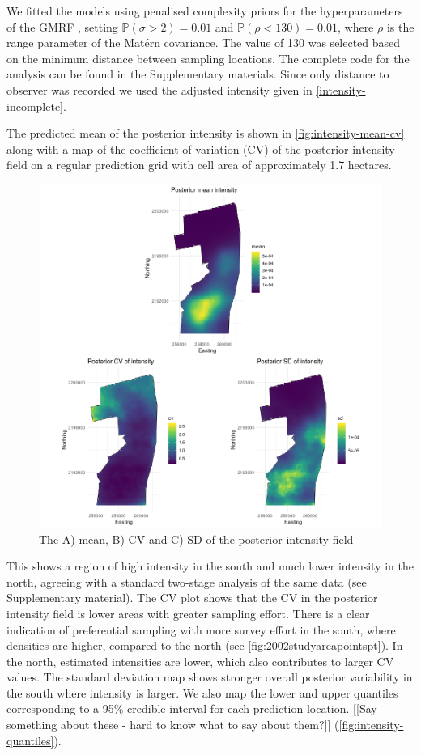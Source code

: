 \documentclass[preprint,12pt]{elsarticle}
\begin{document}
We fitted the models using penalised complexity priors for the hyperparameters of the GMRF \citep{simpson_penalising_2017}, setting $\mathbb{P}(\sigma > 2) = 0.01$ and $\mathbb{P}(\rho < 130) = 0.01$, where $\rho$ is the range parameter of the Mat\'ern covariance.  The value of 130 was selected based on the minimum distance between sampling locations.  The complete code for the analysis can be found in the Supplementary materials.  Since only distance to observer was recorded we used the adjusted intensity given in \eqref{intensity-incomplete}.   

The predicted mean of the posterior intensity is shown in \autoref{fig:intensity-mean-cv} along with a map of the coefficient of variation (CV) of the posterior intensity field on a regular prediction grid with cell area of approximately 1.7 hectares.  
\begin{figure}[h]
	\begin{center}
		\includegraphics[scale=0.525]{figures/intensity_mean_cv_sd.png}
		\caption{The A) mean, B) CV and C) SD of the posterior intensity field}
		\label{fig:intensity-mean-cv}
	\end{center}
\end{figure}
This shows a region of high intensity in the south and much lower intensity in the north, agreeing with a standard two-stage analysis of the same data (see Supplementary material).  The CV plot shows that the CV in the posterior intensity field is lower areas with greater sampling effort.  There is a clear indication of preferential sampling with more survey effort in the south, where densities are higher, compared to the north  (see \autoref{fig:2002studyareapointspt}).  In the north, estimated intensities are lower, which also contributes to larger CV values.  The standard deviation map shows stronger overall posterior variability in the south where intensity is larger.  We also map the lower and upper quantiles corresponding to a 95\% credible interval for each prediction location.  [[Say something about these - hard to know what to say about them?]]   (\autoref{fig:intensity-quantiles}).
\end{document}
